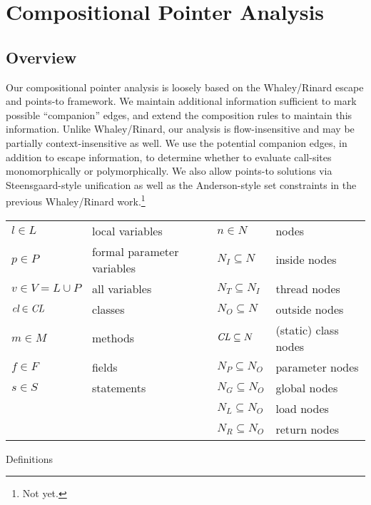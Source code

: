 \documentclass[11pt,notitlepage]{article}
\newcommand{\bigvar}[1]{\ensuremath{\text{\it #1}}}
\newcommand{\func}[1]{\ensuremath{\text{\sffamily #1}}}
\begin{document}
\section{Compositional Pointer Analysis}

\subsection{Overview}
Our compositional pointer analysis is loosely based on the Whaley/Rinard
escape and points-to framework.  We maintain additional
information sufficient to mark possible ``companion'' edges, and
extend the composition rules to maintain this information.
Unlike Whaley/Rinard, our analysis is flow-insensitive
and may be partially context-insensitive as well.  
We use the potential companion edges, in addition to escape information,
to determine whether to evaluate call-sites monomorphically or
polymorphically.
We also allow points-to solutions via Steensgaard-style unification as well as
the Anderson-style set constraints in the previous Whaley/Rinard
work.\footnote{Not yet.}

\begin{myfigure}
\begin{tabular}{ll|ll}
$l\in L$ & local variables           &$n\in N$ & nodes\\
$p\in P$ & formal parameter variables&$N_I\subseteq N$ & inside nodes\\
$v\in V=L\cup P$& all variables      &$N_T\subseteq N_I$ & thread nodes\\
$\bigvar{cl}\in \bigvar{CL}$& classes&$N_O\subseteq N$ & outside nodes\\
$m\in M$ & methods                   &$\bigvar{CL}\subseteq N$ 
                                                       & (static) class nodes\\
$f\in F$ & fields                    &$N_P\subseteq N_O$ & parameter nodes\\
$s\in S$ & statements                &$N_G\subseteq N_O$ & global nodes\\
         &                           &$N_L\subseteq N_O$ & load nodes\\
         &                           &$N_R\subseteq N_O$ & return nodes\\
\end{tabular}
\caption{Definitions}
\label{fig:defin}
\end{myfigure}

\newcommand{\ptgraph}
           {\tuple{O,I,\func{e},\func{c}_\text{from},\func{c}_\text{to},r}}
                             
\end{document}
